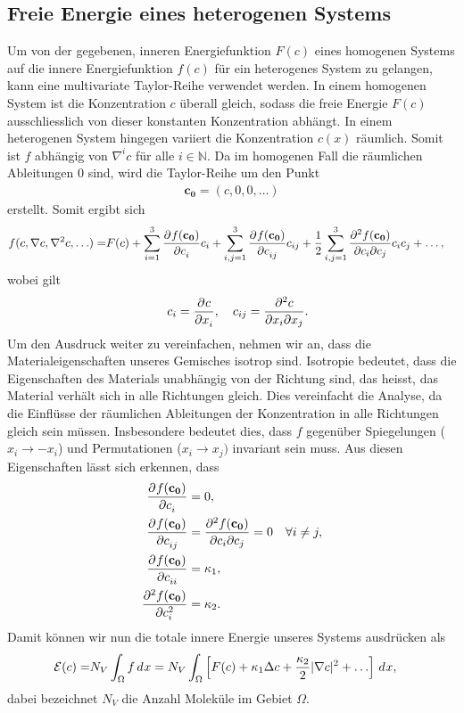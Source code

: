 \subsection{Freie Energie eines heterogenen Systems}
Um von der gegebenen, inneren Energiefunktion $F(c)$ eines homogenen Systems
%
auf die innere Energiefunktion $f(c)$ für ein heterogenes System zu gelangen,
kann eine multivariate Taylor-Reihe verwendet werden.
%
In einem homogenen System ist die Konzentration $c$ überall gleich,
sodass die freie Energie $F(c)$ ausschliesslich von dieser konstanten Konzentration abhängt.
In einem heterogenen System hingegen variiert die Konzentration $c(x)$ räumlich.
Somit ist $f$ abhängig von $\nabla^i c$ für alle $i \in \mathbb{N}$.
Da im homogenen Fall die räumlichen Ableitungen $0$ sind,
wird die Taylor-Reihe um den Punkt
\begin{align*}
\mathbf{c_0}
=
(c, 0, 0, \ldots)
\end{align*}
erstellt.
Somit ergibt sich
\begin{align*}
f(c, \nabla c, \nabla^2 c, \ldots)
=
& F(c)
+ \sum_{i=1}^3 \pderiv{f(\mathbf{c_0})}{c_i} c_i
+ \sum_{i,j=1}^3 \pderiv{f(\mathbf{c_0})}{c_{ij}} c_{ij}
+ \frac{1}{2} \sum_{i,j=1}^3 \frac{\partial^2 f(\mathbf{c_0})}{%
\partial c_i \partial c_j} c_{i} c_{j}
+ \ldots
,
\end{align*}
wobei gilt
\begin{align*}
\quad
c_i
=
\pderiv{c}{x_i}
,\quad
c_{ij}
=
\frac{\partial^2 c}{\partial x_i \partial x_j}
.
\end{align*}
Um den Ausdruck weiter zu vereinfachen,
nehmen wir an,
dass die Materialeigenschaften unseres Gemisches isotrop sind.
%
%
Isotropie bedeutet,
dass die Eigenschaften des Materials unabhängig von der Richtung sind,
das heisst,
das Material verhält sich in alle Richtungen gleich.
Dies vereinfacht die Analyse,
da die Einflüsse der räumlichen Ableitungen der Konzentration
in alle Richtungen gleich sein müssen.
Insbesondere bedeutet dies,
dass $f$ gegenüber Spiegelungen ($x_i \rightarrow -x_i$) und
Permutationen ($x_i \rightarrow x_j)$ invariant sein muss.
Aus diesen Eigenschaften lässt sich erkennen,
dass
\begin{align*}
\pderiv{f(\mathbf{c_0})}{c_i}
&=
0,
\\
\pderiv{f(\mathbf{c_0})}{c_{ij}}
&=
\frac{\partial^2 f(\mathbf{c_0})}{\partial c_i \partial c_j}
=
0
\quad \forall i \neq j,
\\
\pderiv{f(\mathbf{c_0})}{c_{ii}}
&=
\kappa_1,
\\
 \pderiv[2]{f(\mathbf{c_0})}{c_i}
&=
\kappa_2
.
\end{align*}
Damit können wir nun die totale innere Energie unseres Systems ausdrücken als
\begin{align}
\mathcal{E}(c)
=
&N_V \int_\Omega f\di{x}
=
N_V \int_\Omega \left[
F(c) + \kappa_1 \Delta c + \frac{\kappa_2}{2} |\nabla c|^2  + \ldots
\right]\di{x}
\label{cahnhilliard:energylong}
,
\end{align}
dabei bezeichnet $N_V$ die Anzahl Moleküle im Gebiet $\Omega$.

